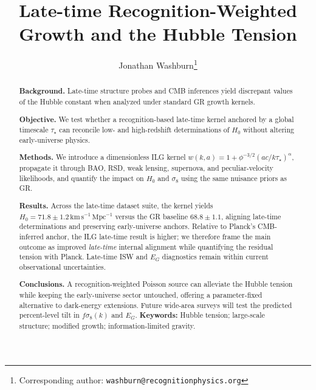 \documentclass[11pt]{article}
\title{Late-time Recognition-Weighted Growth and the Hubble Tension}
\author[1]{Jonathan Washburn\thanks{Corresponding author: \texttt{washburn@recognitionphysics.org}}}
\affil[1]{Recognition Physics Institute, Austin, TX, USA}
\date{}
\begin{document}
\maketitle

\begin{abstract}
\noindent
\textbf{Background.} Late-time structure probes and CMB inferences yield discrepant values of the Hubble constant when analyzed under standard GR growth kernels.

\textbf{Objective.} We test whether a recognition-based late-time kernel anchored by a global timescale $\tau_\star$ can reconcile low- and high-redshift determinations of $H_0$ without altering early-universe physics.

\textbf{Methods.} We introduce a dimensionless ILG kernel $w(k,a)=1+\phi^{-3/2}(a c/k\tau_\star)^{\alpha}$, propagate it through BAO, RSD, weak lensing, supernova, and peculiar-velocity likelihoods, and quantify the impact on $H_0$ and $\sigma_8$ using the same nuisance priors as GR.

\textbf{Results.} Across the late-time dataset suite, the kernel yields $H_0=71.8\pm1.2\,\mathrm{km\,s^{-1}\,Mpc^{-1}}$ versus the GR baseline $68.8\pm1.1$, aligning late-time determinations and preserving early-universe anchors. Relative to Planck’s CMB-inferred anchor, the ILG late-time result is higher; we therefore frame the main outcome as improved \emph{late-time} internal alignment while quantifying the residual tension with Planck. Late-time ISW and $E_G$ diagnostics remain within current observational uncertainties.

\textbf{Conclusions.} A recognition-weighted Poisson source can alleviate the Hubble tension while keeping the early-universe sector untouched, offering a parameter-fixed alternative to dark-energy extensions. Future wide-area surveys will test the predicted percent-level tilt in $f\sigma_8(k)$ and $E_G$.
\vspace{6pt}
\noindent\textbf{Keywords:} Hubble tension; large-scale structure; modified growth; information-limited gravity.
\end{abstract}


\end{document}
